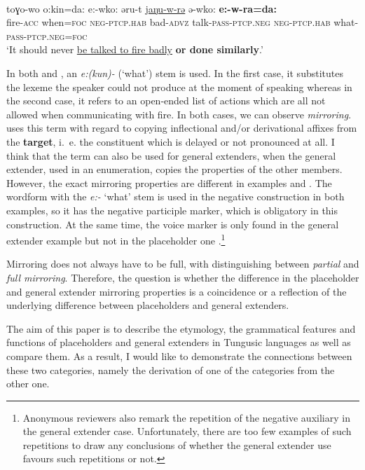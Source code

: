 \documentclass[output=paper,colorlinks,citecolor=brown
\ChapterDOI{10.5281/zenodo.15697577}
]{langscibook}
\begin{document}
\ea
\label{ex:klyachko:1.2}
\\
\gll toɣo-wo	o:kin=da:	e:-wko:	əru-t		\uline{jaŋu-w-rə} ə-wko:			\textbf{e:-w-ra=da:} \\
 fire-\textsc{acc} when=\textsc{foc} \textsc{neg}-\textsc{ptcp.hab} bad-\textsc{advz} talk-\textsc{pass}-\textsc{ptcp.neg} \textsc{neg}-\textsc{ptcp.hab} what-\textsc{pass}-\textsc{ptcp.neg}=\textsc{foc}\\
\glt `It should never \uline{be talked to fire badly} \textbf{or done similarly}.'
\z
{}

In both  and , an \textit{e:(kun)-} (`what') stem is used. In the first case, it substitutes the lexeme the speaker could not produce at the moment of speaking whereas in the second case, it refers to an open-ended list of actions which are all not allowed when communicating with fire. In both cases, we can observe \textit{mirroring}. \citet{Podlesskaya2010} uses this term with regard to copying inflectional and/or derivational affixes from the \textbf{target}, i.~e. the constituent which is delayed or not pronounced at all. I think that the term can also be used for general extenders, when the general extender, used in an enumeration, copies the properties of the other members. However, the exact mirroring properties are different in examples  and .
The wordform with the \textit{e:-} `what' stem is used in the negative construction in both examples, so it has the negative participle marker, which is obligatory in this construction. At the same time, the voice marker is only found in the general extender example  but not in the placeholder one .\footnote{Anonymous reviewers also remark the repetition of the negative auxiliary in the general extend\-er case. Unfortunately, there are too few examples of such repetitions to draw any conclusions of whether the general extender use favours such repetitions or not.}

Mirroring does not always have to be full, with \citet{Podlesskaya2010} distinguishing between \textit{partial} and \textit{full mirroring}. Therefore, the question is whether the difference in the placeholder and general extender mirroring properties is a coincidence or a reflection of the underlying difference between placeholders and general extenders.

The aim of this paper is to describe the etymology, the grammatical features and functions of placeholders and general extenders in Tungusic languages as well as compare them. As a result, I would like to demonstrate the connections between these two categories, namely the derivation of one of the categories from the other one.
\end{document}
